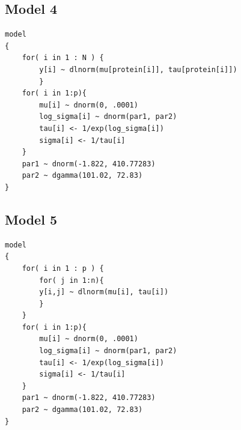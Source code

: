 \documentclass{article}
\begin{document}
\subsection*{Model 4}
\begin{lstlisting}
model
{
	for( i in 1 : N ) {
		y[i] ~ dlnorm(mu[protein[i]], tau[protein[i]])
		}
	for( i in 1:p){
		mu[i] ~ dnorm(0, .0001)
		log_sigma[i] ~ dnorm(par1, par2)
		tau[i] <- 1/exp(log_sigma[i])
		sigma[i] <- 1/tau[i]
	}
	par1 ~ dnorm(-1.822, 410.77283)
	par2 ~ dgamma(101.02, 72.83)
}
\end{lstlisting}


\subsection*{Model 5}
\begin{lstlisting}
model
{
	for( i in 1 : p ) {
		for( j in 1:n){
		y[i,j] ~ dlnorm(mu[i], tau[i])
		}
	}
	for( i in 1:p){
		mu[i] ~ dnorm(0, .0001)
		log_sigma[i] ~ dnorm(par1, par2)
		tau[i] <- 1/exp(log_sigma[i])
		sigma[i] <- 1/tau[i]
	}
	par1 ~ dnorm(-1.822, 410.77283)
	par2 ~ dgamma(101.02, 72.83)
}
\end{lstlisting}



\end{document}
